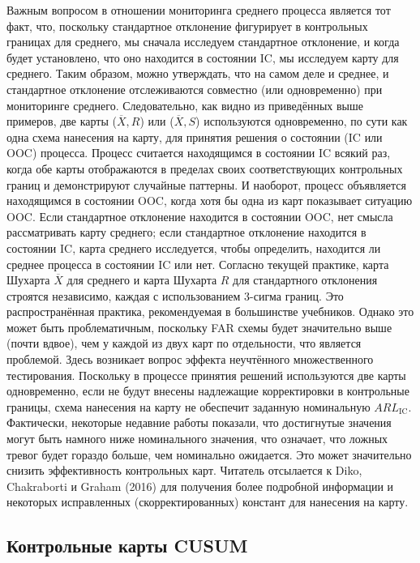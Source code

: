 Важным вопросом в отношении мониторинга среднего процесса является тот факт, что, поскольку стандартное отклонение фигурирует в контрольных границах для среднего, мы сначала исследуем стандартное отклонение, и когда будет установлено, что оно находится в состоянии IC, мы исследуем карту для среднего. Таким образом, можно утверждать, что на самом деле и среднее, и стандартное отклонение отслеживаются совместно (или одновременно) при мониторинге среднего. Следовательно, как видно из приведённых выше примеров, две карты (\(\overline{X}, R\)) или (\(\overline{X}, S\)) используются одновременно, по сути как одна схема нанесения на карту, для принятия решения о состоянии (IC или OOC) процесса. Процесс считается находящимся в состоянии IC всякий раз, когда обе карты отображаются в пределах своих соответствующих контрольных границ и демонстрируют случайные паттерны. И наоборот, процесс объявляется находящимся в состоянии OOC, когда хотя бы одна из карт показывает ситуацию OOC. Если стандартное отклонение находится в состоянии OOC, нет смысла рассматривать карту среднего; если стандартное отклонение находится в состоянии IC, карта среднего исследуется, чтобы определить, находится ли среднее процесса в состоянии IC или нет. Согласно текущей практике, карта Шухарта \(\overline{X}\) для среднего и карта Шухарта \(R\) для стандартного отклонения строятся независимо, каждая с использованием 3-сигма границ. Это распространённая практика, рекомендуемая в большинстве учебников. Однако это может быть проблематичным, поскольку FAR схемы будет значительно выше (почти вдвое), чем у каждой из двух карт по отдельности, что является проблемой. Здесь возникает вопрос эффекта неучтённого множественного тестирования. Поскольку в процессе принятия решений используются две карты одновременно, если не будут внесены надлежащие корректировки в контрольные границы, схема нанесения на карту не обеспечит заданную номинальную \(ARL_{\text{IC}}\). Фактически, некоторые недавние работы показали, что достигнутые значения могут быть намного ниже номинального значения, что означает, что ложных тревог будет гораздо больше, чем номинально ожидается. Это может значительно снизить эффективность контрольных карт. Читатель отсылается к Diko, Chakraborti и Graham (2016) для получения более подробной информации и некоторых исправленных (скорректированных) констант для нанесения на карту.

\subsection{Контрольные карты CUSUM}

